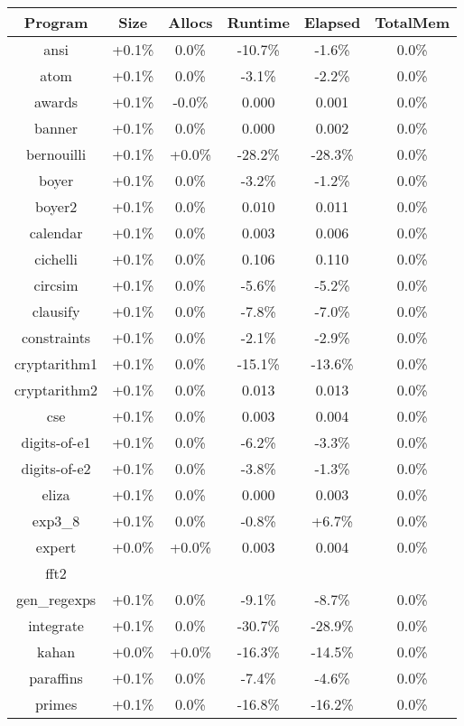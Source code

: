 \begin{tabular}{ c c c c c c }
Program & Size & Allocs & Runtime & Elapsed & TotalMem\\
\hline
ansi & +0.1\% &  0.0\% & -10.7\% & -1.6\% &  0.0\%\\
atom & +0.1\% &  0.0\% & -3.1\% & -2.2\% &  0.0\%\\
awards & +0.1\% & -0.0\% & 0.000 & 0.001 &  0.0\%\\
banner & +0.1\% &  0.0\% & 0.000 & 0.002 &  0.0\%\\
bernouilli & +0.1\% & +0.0\% & -28.2\% & -28.3\% &  0.0\%\\
boyer & +0.1\% &  0.0\% & -3.2\% & -1.2\% &  0.0\%\\
boyer2 & +0.1\% &  0.0\% & 0.010 & 0.011 &  0.0\%\\
calendar & +0.1\% &  0.0\% & 0.003 & 0.006 &  0.0\%\\
cichelli & +0.1\% &  0.0\% & 0.106 & 0.110 &  0.0\%\\
circsim & +0.1\% &  0.0\% & -5.6\% & -5.2\% &  0.0\%\\
clausify & +0.1\% &  0.0\% & -7.8\% & -7.0\% &  0.0\%\\
constraints & +0.1\% &  0.0\% & -2.1\% & -2.9\% &  0.0\%\\
cryptarithm1 & +0.1\% &  0.0\% & -15.1\% & -13.6\% &  0.0\%\\
cryptarithm2 & +0.1\% &  0.0\% & 0.013 & 0.013 &  0.0\%\\
cse & +0.1\% &  0.0\% & 0.003 & 0.004 &  0.0\%\\
digits-of-e1 & +0.1\% &  0.0\% & -6.2\% & -3.3\% &  0.0\%\\
digits-of-e2 & +0.1\% &  0.0\% & -3.8\% & -1.3\% &  0.0\%\\
eliza & +0.1\% &  0.0\% & 0.000 & 0.003 &  0.0\%\\
exp3\_8 & +0.1\% &  0.0\% & -0.8\% & +6.7\% &  0.0\%\\
expert & +0.0\% & +0.0\% & 0.003 & 0.004 &  0.0\%\\
fft2 &  &  &  &  & \\
gen\_regexps & +0.1\% &  0.0\% & -9.1\% & -8.7\% &  0.0\%\\
integrate & +0.1\% &  0.0\% & -30.7\% & -28.9\% &  0.0\%\\
kahan & +0.0\% & +0.0\% & -16.3\% & -14.5\% &  0.0\%\\
paraffins & +0.1\% &  0.0\% & -7.4\% & -4.6\% &  0.0\%\\
primes & +0.1\% &  0.0\% & -16.8\% & -16.2\% &  0.0\%\\

\end{tabular}
